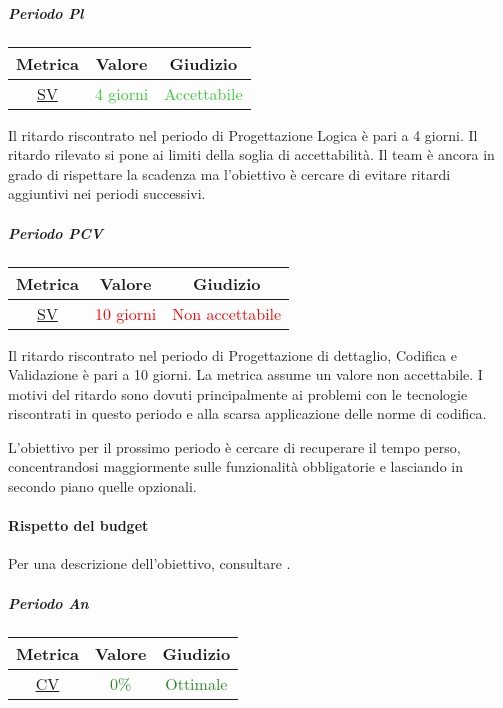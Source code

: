 			
				\subparagraph{Periodo Pl}
				
				\begin{table}[H]
					\centering
					\begin{tabular}{  c | c | c}
						\hline
						\textbf{Metrica} & \textbf{Valore} & \textbf{Giudizio} \\
						\hline
						\hyperref[MRDB]{SV}    & \textcolor{LimeGreen}{4 giorni}      & \textcolor{LimeGreen}{Accettabile}  \\\hline
					\end{tabular}
				\end{table}
			
					Il ritardo riscontrato nel periodo di Progettazione Logica è pari a 4 giorni. Il ritardo rilevato si pone ai limiti della soglia di accettabilità. Il team è ancora in grado di rispettare la scadenza ma l'obiettivo è cercare di evitare ritardi aggiuntivi nei periodi successivi.
					
					\subparagraph{Periodo PCV}
					
					\begin{table}[H]
						\centering
						\begin{tabular}{  c | c | c}
							\hline
							\textbf{Metrica} & \textbf{Valore} & \textbf{Giudizio} \\
							\hline
							\hyperref[MRDB]{SV}    & \textcolor{Red}{10 giorni}      & \textcolor{Red}{Non accettabile}  \\\hline
						\end{tabular}
					\end{table}
					
					Il ritardo riscontrato nel periodo di Progettazione di dettaglio, Codifica e Validazione è pari a 10 giorni. La metrica assume un valore non accettabile.
					I motivi del ritardo sono dovuti principalmente ai problemi con le tecnologie riscontrati in questo periodo e alla scarsa applicazione delle norme di codifica.
					
					
					L'obiettivo per il prossimo periodo è cercare di recuperare il tempo perso, concentrandosi maggiormente sulle funzionalità obbligatorie e lasciando in secondo piano quelle opzionali.
					
					\newpage
			\paragraph{Rispetto del budget}
			\label{RRDB}
			Per una descrizione dell'obiettivo, consultare .
				\subparagraph{Periodo An}
					\begin{table}[H]
						\centering
							\begin{tabular}{  c | c | c}
								\hline
									\textbf{Metrica} & \textbf{Valore} & \textbf{Giudizio} \\
								\hline
								    \hyperref[MRDB]{CV}    & \textcolor{ForestGreen}{0\%}      & \textcolor{ForestGreen}{Ottimale}  \\\hline
							\end{tabular}
					\end{table}
			
